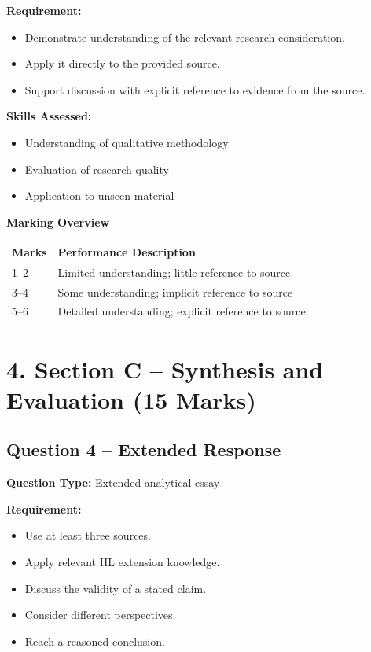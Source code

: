 \documentclass[12pt,a4paper]{article}
\begin{document}
\textbf{Requirement:}
\begin{itemize}
    \item Demonstrate understanding of the relevant research consideration.
    \item Apply it directly to the provided source.
    \item Support discussion with explicit reference to evidence from the source.
\end{itemize}

\textbf{Skills Assessed:}
\begin{itemize}
    \item Understanding of qualitative methodology
    \item Evaluation of research quality
    \item Application to unseen material
\end{itemize}

\textbf{Marking Overview}

\begin{center}
\begin{tabular}{ll}
\toprule
\textbf{Marks} & \textbf{Performance Description} \\
\midrule
1--2 & Limited understanding; little reference to source \\
3--4 & Some understanding; implicit reference to source \\
5--6 & Detailed understanding; explicit reference to source \\
\bottomrule
\end{tabular}
\end{center}

\section*{4. Section C – Synthesis and Evaluation (15 Marks)}

\subsection*{Question 4 – Extended Response}

\textbf{Question Type:} Extended analytical essay  

\textbf{Requirement:}
\begin{itemize}
    \item Use at least three sources.
    \item Apply relevant HL extension knowledge.
    \item Discuss the validity of a stated claim.
    \item Consider different perspectives.
    \item Reach a reasoned conclusion.
\end{itemize}
\end{document}
